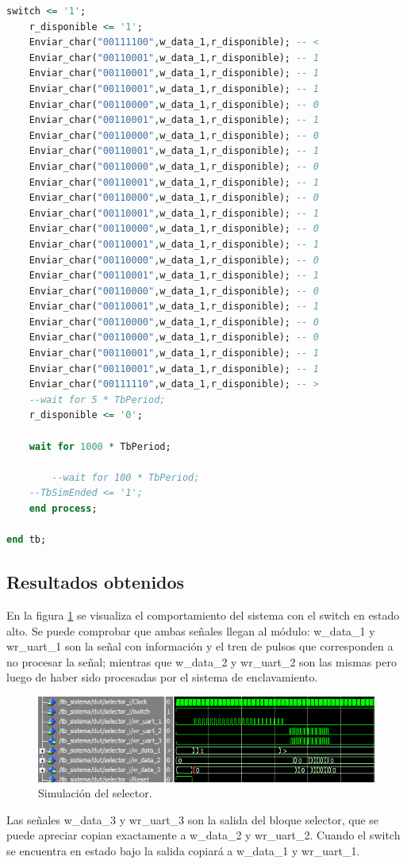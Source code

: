 \begin{lstlisting}[language = vhdl,caption=Testbench del módulo selector,label={lst:test_selector}]
	switch <= '1';
	r_disponible <= '1';
	Enviar_char("00111100",w_data_1,r_disponible); -- < 	
	Enviar_char("00110001",w_data_1,r_disponible); -- 1 	
	Enviar_char("00110001",w_data_1,r_disponible); -- 1
 	Enviar_char("00110001",w_data_1,r_disponible); -- 1 	
	Enviar_char("00110000",w_data_1,r_disponible); -- 0
	Enviar_char("00110001",w_data_1,r_disponible); -- 1 	
	Enviar_char("00110000",w_data_1,r_disponible); -- 0
	Enviar_char("00110001",w_data_1,r_disponible); -- 1 	
	Enviar_char("00110000",w_data_1,r_disponible); -- 0
	Enviar_char("00110001",w_data_1,r_disponible); -- 1 	
	Enviar_char("00110000",w_data_1,r_disponible); -- 0
	Enviar_char("00110001",w_data_1,r_disponible); -- 1 	
	Enviar_char("00110000",w_data_1,r_disponible); -- 0
	Enviar_char("00110001",w_data_1,r_disponible); -- 1 	
	Enviar_char("00110000",w_data_1,r_disponible); -- 0
	Enviar_char("00110001",w_data_1,r_disponible); -- 1 	
	Enviar_char("00110000",w_data_1,r_disponible); -- 0
	Enviar_char("00110001",w_data_1,r_disponible); -- 1 	
	Enviar_char("00110000",w_data_1,r_disponible); -- 0
	Enviar_char("00110000",w_data_1,r_disponible); -- 0	
	Enviar_char("00110001",w_data_1,r_disponible); -- 1 
	Enviar_char("00110001",w_data_1,r_disponible); -- 1 	
	Enviar_char("00111110",w_data_1,r_disponible); -- >
	--wait for 5 * TbPeriod;
	r_disponible <= '0';
	
	wait for 1000 * TbPeriod;

        --wait for 100 * TbPeriod;
	--TbSimEnded <= '1';
    end process;
	
end tb;
		\end{lstlisting}
			
	\subsection{Resultados obtenidos}
				
		En la figura \ref{fig:Test_Selector} se visualiza el comportamiento del sistema con el switch en estado alto. Se puede comprobar que ambas señales llegan al módulo: w\_data\_1 y wr\_uart\_1 son la señal con información y el tren de pulsos que corresponden a no procesar la señal; mientras que w\_data\_2 y wr\_uart\_2 son las mismas pero luego de haber sido procesadas por el sistema de enclavamiento.
			
	\begin{figure}[h]
	\centering
	\includegraphics[scale=0.95]{./Figures/Test/Selector}
		\caption{Simulación del selector.}
		\label{fig:Test_Selector}
	\end{figure}
	
	\vspace{5cm}
			
	Las señales w\_data\_3 y wr\_uart\_3 son la salida del bloque selector, que se puede apreciar copian exactamente a w\_data\_2 y wr\_uart\_2. Cuando el switch se encuentra en estado bajo la salida copiará a w\_data\_1 y wr\_uart\_1.
